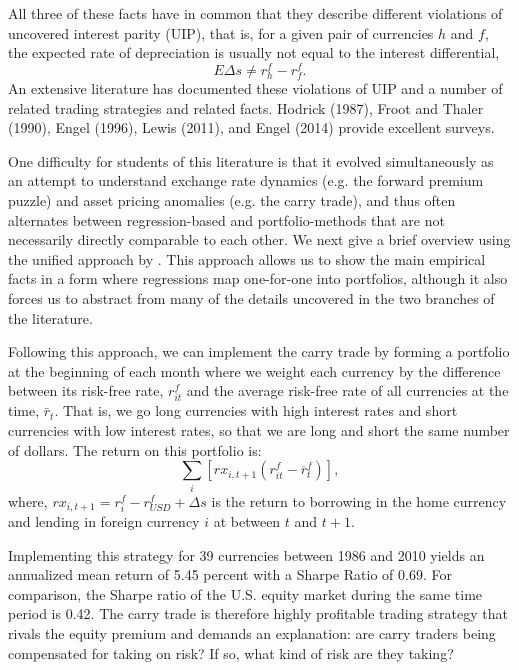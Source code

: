 \documentclass{ar-1col}
\begin{document}
All three of these facts have in common that they describe different violations of uncovered interest parity (UIP), that is, for a given pair of currencies $h$ and $f$, the expected rate of depreciation is usually not equal to the interest differential, $$E\Delta s \neq r^f_h-r^f_f .$$ An extensive literature has documented these violations of UIP and a number of related trading strategies and related facts. Hodrick (1987), Froot and Thaler (1990), Engel (1996), Lewis (2011), and Engel (2014) provide excellent surveys.

One difficulty for students of this literature is that it evolved simultaneously as an attempt to understand exchange rate dynamics (e.g. the forward premium puzzle) and asset pricing anomalies (e.g. the carry trade), and thus often alternates between regression-based and portfolio-methods that are not necessarily directly comparable to each other. We next give a brief overview using the unified approach by \citet{HassanMano2015}. This approach allows us to show the main empirical facts in a form where regressions map one-for-one into portfolios, although it also forces us to abstract from many of the details uncovered in the two branches of the literature.

Following this approach, we can implement the carry trade by forming a portfolio at the beginning of each month where we weight each currency by the difference between its risk-free rate, $r^f_{it}$ and the average risk-free rate of all currencies at the time, $\bar{r}_t$. That is, we go long currencies with high interest rates and short currencies with low interest rates, so that we are long and short the same number of dollars. The return on this portfolio is:
\begin{equation}
  \label{eq_carry}
  \textstyle\sum_{i}\left[ rx_{i,t+1}\left( r^f_{it}-\overline{r}^f_{t}\right) \right] ,
\end{equation}%
where, $rx_{i,t+1}=r^f_i-r^f_{USD}+\Delta s$ is the return to borrowing in the home currency and lending in foreign currency $i$ at between $t$ and $t+1$.

Implementing this strategy for 39 currencies between 1986 and 2010 yields an annualized mean return of 5.45 percent with a Sharpe Ratio of 0.69. For comparison, the Sharpe ratio of the U.S. equity market during the same time period is 0.42. The carry trade is therefore highly profitable trading strategy that rivals the equity premium and demands an explanation: are carry traders being compensated for taking on risk? If so, what kind of risk are they taking?
\end{document}
